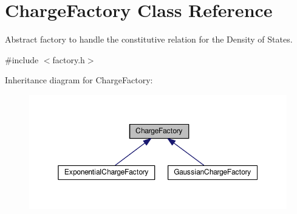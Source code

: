 \hypertarget{classChargeFactory}{\section{Charge\-Factory Class Reference}
\label{classChargeFactory}
}


Abstract factory to handle the constitutive relation for the Density of States.  




{\ttfamily \#include $<$factory.\-h$>$}



Inheritance diagram for Charge\-Factory\-:\nopagebreak
\begin{figure}[H]
\begin{center}
\leavevmode
\includegraphics[width=350pt]{classChargeFactory__inherit__graph}
\end{center}
\end{figure}
